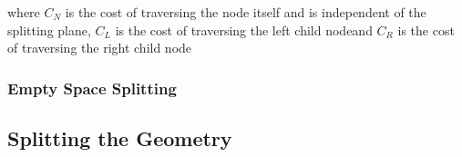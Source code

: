 where $C_N$ is the cost of traversing the node itself and is
independent of the splitting plane, $C_L$ is the cost of traversing
the left child nodeand $C_R$ is the cost of traversing the right child
node










\subsubsection{Empty Space Splitting}




\subsection{Splitting the Geometry}

